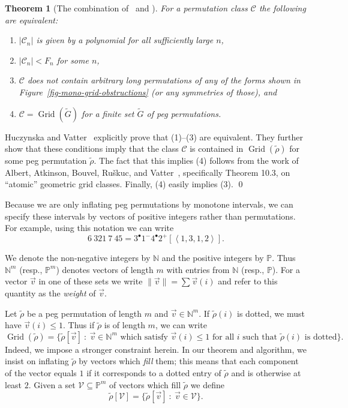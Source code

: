 \documentclass[10pt]{article}
\theoremstyle{plain}
\newtheorem{theorem}{Theorem}[section]
\theoremstyle{definition}
\newenvironment{proofsketch}{\noindent{\it Sketch of proof.}}{\qed\bigskip}
\newcommand{\C}{\mathcal{C}}
\newcommand{\vect}[1]{\left\langle #1 \right\rangle}
\newcommand{\Grid}{\operatorname{Grid}}
\newcommand{\st}{\::\:}
\newcommand{\p}[1]{#1^+}
\newcommand{\m}[1]{#1^-}
\renewcommand{\d}[1]{#1^{\bullet}}
\begin{document}
\begin{theorem}[The combination of~{\cite[Corollary 3.4]{huczynska:grid-classes-an:}} and {\cite[Theorem 10.3]{albert:geometric-grid-:}}]
\label{thm-poly-tfae}
For a permutation class $\C$ the following are equivalent:
\begin{enumerate}
\item[(1)] $|\C_n|$ is given by a polynomial for all sufficiently large $n$,
\item[(2)] $|\C_n|<F_n$ for some $n$,
\item[(3)] $\C$ does not contain arbitrary long permutations of any of the forms 
shown in Figure~\ref{fig-mono-grid-obstructions} (or any symmetries of those), and
\item[(4)] $\C=\Grid(\tilde{G})$ for a finite set $\tilde{G}$ of peg 
permutations.
\end{enumerate}
\end{theorem}
\begin{proofsketch}
Huczynska and Vatter~\cite{huczynska:grid-classes-an:} explicitly prove that (1)--(3) are equivalent. They further show that these conditions imply that the class $\C$ is contained in $\Grid(\tilde{\rho})$ for some peg permutation $\tilde{\rho}$. The fact that this implies (4) follows from the work of Albert, Atkinson, Bouvel, Ru\v{s}kuc, and Vatter~\cite{albert:geometric-grid-:}, specifically Theorem 10.3, on ``atomic'' geometric grid classes. Finally, (4) easily implies (3).
\end{proofsketch}

Because we are only inflating peg permutations by monotone intervals, we can specify these intervals by vectors of positive integers rather than permutations. For example, using this notation we can write
\[
	6\ 321\ 7\ 45 = \d{3}\m{1}\d{4}\p{2}[\vect{1,3,1,2}].
\]

We denote the non-negative integers by $\mathbb{N}$ and the positive integers by $\mathbb{P}$. Thus $\mathbb{N}^m$ (resp., $\mathbb{P}^m$) denotes vectors of length $m$ with entries from $\mathbb{N}$ (resp., $\mathbb{P}$). For a vector $\vec{v}$ in one of these sets we write $\|\vec{v}\|=\sum \vec{v}(i)$ and refer to this quantity as the \emph{weight} of $\vec{v}$.

Let $\tilde{\rho}$ be a peg permutation of length $m$ and $\vec{v}\in\mathbb{N}^m$. If $\tilde{\rho}(i)$ is dotted, we must have $\vec{v}(i)\le 1$. Thus if $\tilde{\rho}$ is of length $m$, we can write
\[
	\Grid(\tilde{\rho})
	=
	\{\tilde{\rho}[\vec{v}] \st \vec{v}\in\mathbb{N}^m \mbox{ which satisfy } \vec{v}(i)\le 1 \mbox{ for all $i$ such that $\tilde{\rho}(i)$ is dotted}\}.
\]
Indeed, we impose a stronger constraint herein. In our theorem and algorithm, we insist on inflating $\tilde{\rho}$ by vectors which \emph{fill} them; this means that each component of the vector equals $1$ if it corresponds to a dotted entry of $\tilde{\rho}$ and is otherwise at least $2$. Given a set $\mathcal{V}\subseteq\mathbb{P}^m$ of vectors which fill $\tilde{\rho}$ we define
\[
	\tilde{\rho}[\mathcal{V}]
	=
	\{\tilde{\rho}[\vec{v}] \st \vec{v}\in\mathcal{V}\}.
\]
\end{document}
